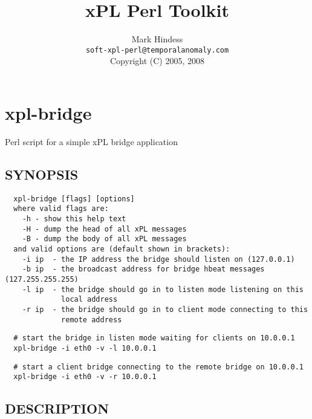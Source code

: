 \documentclass[12pt,a4paper]{article}
\title{xPL Perl Toolkit}
\author{Mark Hindess\\
  \texttt{soft-xpl-perl@temporalanomaly.com}\\
  Copyright (C) 2005, 2008}
\begin{document}
\newcommand{\comment}[1]{}
\setlength{\parindent}{0pt}
\addtolength{\parskip}{5pt}

\def\href#1#2{\special{html:<a href="#1">}{#2}\special{html:</a>}}
\def\url#1{\special{html:<a href="#1">}{\tt{#1}}\special{html:</a>}}
\def\msg#1{\texttt{#1}}
\def\method#1{\texttt{#1}}
\def\field#1{\texttt{#1}}
\def\cmd#1{\texttt{#1}}

\maketitle
\newpage
\tableofcontents
\newpage
\section{xpl-bridge\label{xpl-bridge}}


Perl script for a simple xPL bridge application

\subsection*{SYNOPSIS\label{xpl-bridge_SYNOPSIS}}
\begin{verbatim}
  xpl-bridge [flags] [options]
  where valid flags are:
    -h - show this help text
    -H - dump the head of all xPL messages
    -B - dump the body of all xPL messages
  and valid options are (default shown in brackets):
    -i ip  - the IP address the bridge should listen on (127.0.0.1)
    -b ip  - the broadcast address for bridge hbeat messages (127.255.255.255)
    -l ip  - the bridge should go in to listen mode listening on this
             local address
    -r ip  - the bridge should go in to client mode connecting to this
             remote address
\end{verbatim}
\begin{verbatim}
  # start the bridge in listen mode waiting for clients on 10.0.0.1
  xpl-bridge -i eth0 -v -l 10.0.0.1
\end{verbatim}
\begin{verbatim}
  # start a client bridge connecting to the remote bridge on 10.0.0.1
  xpl-bridge -i eth0 -v -r 10.0.0.1
\end{verbatim}
\subsection*{DESCRIPTION\label{xpl-bridge_DESCRIPTION}}
\end{document}
